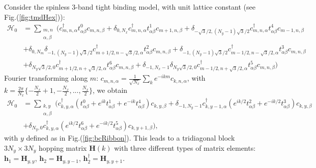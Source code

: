 Consider the spinless 3-band tight binding model, with unit lattice constant (see Fig.(\ref{fig:tmdHex})):
\begin{equation}
\begin{split}
\mathcal{H}_0 &= \sum_{\substack{m, n \\ \alpha, \beta}} \bigg( c_{m,n, \alpha}^\dagger t_{\alpha\beta}^0 c_{m, n, \beta} + \delta_{0, N_x}  c_{m,n, \alpha}^\dagger t_{\alpha\beta}^1 c_{m+1, n, \beta} + \delta_{-\sqrt{3}/2, (N_y -1)\sqrt{3}/2}  c_{m,n, \alpha}^\dagger t_{\alpha\beta}^4 c_{m-1, n, \beta} \\
& + \delta_{0, N_m} \delta_{-1, (N_y -1)\sqrt{3}/2} c_{m+1/2,n-\sqrt{3}/2, \alpha}^\dagger t_{\alpha\beta}^2 c_{m, n, \beta} + \delta_{-1, (N_y -1)\sqrt{3}/2} c_{m-1/2,n-\sqrt{3}/2, \alpha}^\dagger t_{\alpha\beta}^3 c_{m, n, \beta} \\
& + \delta_{N_y\sqrt{3}/2, 0} c_{m+1/2,n+\sqrt{3}/2, \alpha}^\dagger t_{\alpha\beta}^6 c_{m, n, \beta} + \delta_{-1, N_x -1} \delta_{N_y\sqrt{3}/2, 0} c_{m-1/2,n+\sqrt{3}/2, \alpha}^\dagger t_{\alpha\beta}^5 c_{m, n, \beta} \bigg)
\end{split}
\end{equation}
Fourier transforming along $m$: $c_{m, n, \alpha} = \frac{1}{\sqrt{N_x}}\sum_{k} e^{-i k m } c_{k, n, \alpha} $, with $k = \frac{2\pi}{N_x} \{ -\frac{N_x}{2} + 1, -\frac{N_x}{2}, ..., \frac{N_x}{2} \}$, we obtain
\begin{equation}
\begin{split}
\mathcal{H}_0 &= \sum_{ \substack{k, y \\ \alpha, \beta} } \bigg( c_{k, y, \alpha}^\dagger (t_{\alpha \beta}^0  + e^{ik} t_{\alpha \beta}^1 + e^{-ik} t_{\alpha \beta}^4 )  c_{k, y, \beta} + \delta_{-1, N_y -1} c_{k, y - 1, \alpha}^\dagger ( e^{ik/2} t_{\alpha \beta}^2 + e^{-ik/2} t_{\alpha \beta}^3 ) c_{k, y, \beta} \\
& + \delta_{N_y, 0} c_{k, y, \alpha}^\dagger ( e^{ik/2} t_{\alpha \beta}^6 + e^{-ik/2} t_{\alpha \beta}^5 ) c_{k, y+1, \beta} \bigg),
\end{split}
\end{equation}
with $y$ defined as in Fig.(\ref{fig:bcRibbon}).
This leads to a tridiagonal block $3 N_y \times 3 N_y$ hopping matrix $\bm H (k)$ with three different types of matrix elements: $\bm h_1 = \bm H_{y,y}$, $\bm h_2 = \bm H_{y,y-1}$, $\bm h_2^\dagger = \bm H_{y, y+1}$.
